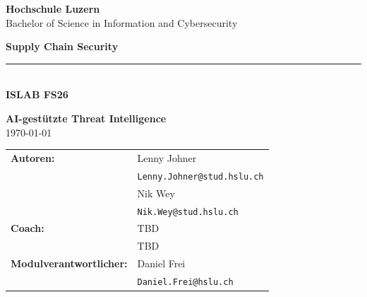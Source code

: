 \begin{titlepage}
    \centering
    \vspace*{1cm}
    
    {\Huge \textbf{Hochschule Luzern}}\\[0.5cm]
    {\Large Bachelor of Science in Information and Cybersecurity}\\
    
    \vfill
    
    {\huge \textbf{Supply Chain Security}}\\
    \rule{12cm}{0.4mm}\\[0.5cm]
    
    {\Large \textbf{ISLAB FS26}}\\
    
    \vfill

    {\large \textbf{AI-gestützte Threat Intelligence}}\\
    \vspace*{1mm}
    {\large \today}\\
    
    \vfill

    \begin{tabular}{>{\bfseries}l l}
        Autoren:      & Lenny Johner \\
                      & \texttt{Lenny.Johner@stud.hslu.ch} \\[0.2cm]
                      & Nik Wey \\
                      & \texttt{Nik.Wey@stud.hslu.ch} \\[0.3cm]

        Coach:        & TBD\\
                      & TBD\\[0.3cm]

        Modulverantwortlicher: & Daniel Frei \\
                               & \texttt{Daniel.Frei@hslu.ch} \\
    \end{tabular}

\end{titlepage}
